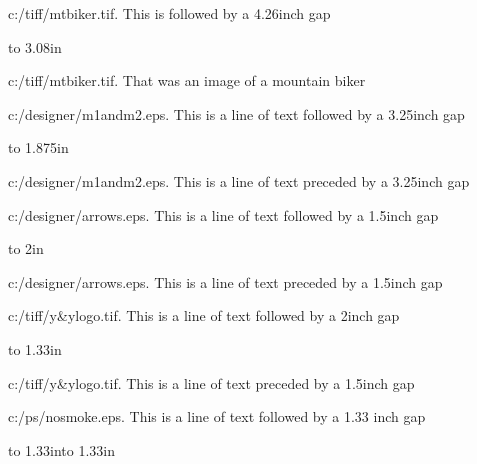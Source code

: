 \newpage

\noindent c:/tiff/mtbiker.tif. This is followed by a 4.26inch gap

\vskip 4.26in


\centerline{\hbox to 3.08in{\hfill}}

\noindent c:/tiff/mtbiker.tif. That was an image of a mountain biker


\newpage

\noindent c:/designer/m1andm2.eps. This is a line of text followed by a 3.25inch gap

\vskip 3.25in

\centerline{\hbox to 1.875in{\hfill}}

\noindent c:/designer/m1andm2.eps. This is a line of text preceded by a 3.25inch gap

\noindent c:/designer/arrows.eps. This is a line of text followed by a 1.5inch gap

\vskip 1.5in

\centerline{\hbox to 2in{\hfill}}

\noindent c:/designer/arrows.eps. This is a line of text preceded by a 1.5inch gap


\newpage %

\noindent c:/tiff/y\&ylogo.tif. This is a line of text followed by a 2inch gap

\vskip 2in

\centerline{\hbox to 1.33in{\hfill}}


\noindent c:/tiff/y\&ylogo.tif. This is a line of text preceded by a 1.5inch gap

\noindent c:/ps/nosmoke.eps. This is a line of text followed by a 1.33 inch gap

\vskip 1.33in

\centerline{\hbox to 1.33in{\hfill}\hbox to 1.33in{\hfill}}

